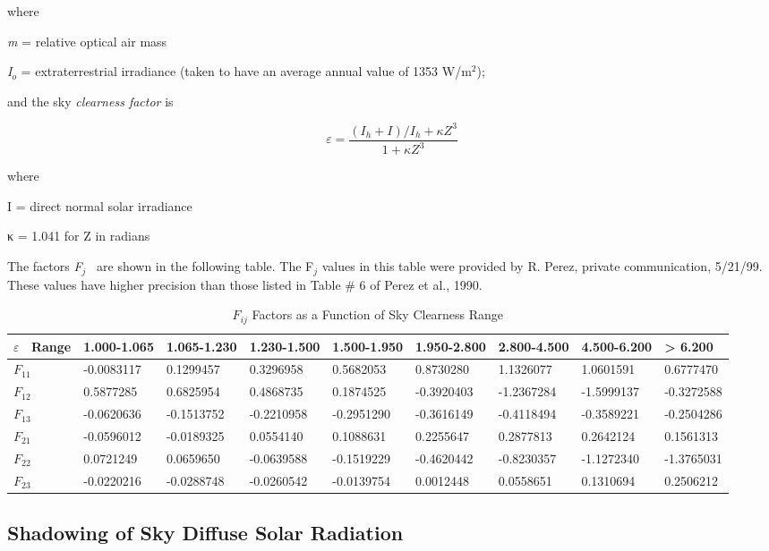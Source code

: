 where

\emph{m} = relative optical air mass

\emph{I\(_{o}\)} = extraterrestrial irradiance (taken to have an average annual value of 1353 W/m\(^{2}\));

and the sky \emph{clearness factor} is

\begin{equation}
\varepsilon  = \frac{{({I_h} + I)/{I_h} + \kappa {Z^3}}}{{1 + \kappa {Z^3}}}
\end{equation}

where

I = direct normal solar irradiance

κ = 1.041 for Z in radians

The factors \emph{F\(_{j}\)} ~are shown in the following table. The F\(_{j}\) values in this table were provided by R. Perez, private communication, 5/21/99. These values have higher precision than those listed in Table \# 6 of Perez et al., 1990.

\begin{longtable}[c]{p{0.4in}p{0.7in}p{0.7in}p{0.7in}p{0.7in}p{0.7in}p{0.7in}p{0.7in}p{0.7in}}
\caption{$F_{ij}$ Factors as a Function of Sky Clearness Range \label{table:fij-factors-as-a-function-of-sky-clearness}}\\
\toprule 
$\varepsilon$~ Range & 1.000-1.065 & 1.065-1.230 & 1.230-1.500 & 1.500-1.950 & 1.950-2.800 & 2.800-4.500 & 4.500-6.200 & >  6.200 \tabularnewline \midrule
$F_{11}$ & -0.0083117 & 0.1299457 & 0.3296958 & 0.5682053 & 0.8730280 & 1.1326077 & 1.0601591 & 0.6777470 \tabularnewline \midrule
$F_{12}$ & 0.5877285 & 0.6825954 & 0.4868735 & 0.1874525 & -0.3920403 & -1.2367284 & -1.5999137 & -0.3272588 \tabularnewline \midrule
$F_{13}$ & -0.0620636 & -0.1513752 & -0.2210958 & -0.2951290 & -0.3616149 & -0.4118494 & -0.3589221 & -0.2504286 \tabularnewline \midrule
$F_{21}$ & -0.0596012 & -0.0189325 & 0.0554140 & 0.1088631 & 0.2255647 & 0.2877813 & 0.2642124 & 0.1561313 \tabularnewline \midrule
$F_{22}$ & 0.0721249 & 0.0659650 & -0.0639588 & -0.1519229 & -0.4620442 & -0.8230357 & -1.1272340 & -1.3765031 \tabularnewline \midrule
$F_{23}$ & -0.0220216 & -0.0288748 & -0.0260542 & -0.0139754 & 0.0012448 & 0.0558651 & 0.1310694 & 0.2506212 \tabularnewline \midrule
\bottomrule
\end{longtable}

\subsection{Shadowing of Sky Diffuse Solar Radiation}\label{shadowing-of-sky-diffuse-solar-radiation}

